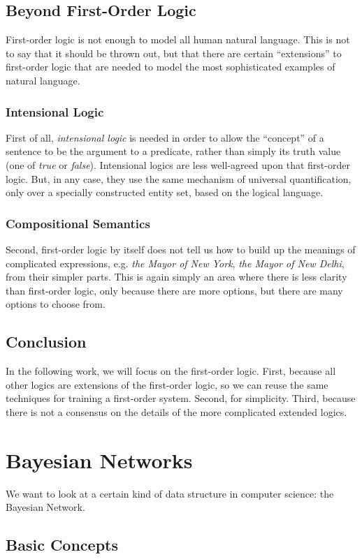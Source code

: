 \documentclass[12pt]{article}
\begin{document}
\subsection{Beyond First-Order Logic}
First-order logic is not enough to model all human natural language.
This is not to say that it should be thrown out, but that there are certain ``extensions'' to first-order logic that are needed to model the most sophisticated examples of natural language.
\subsubsection{Intensional Logic}
First of all, {\em intensional logic} is needed in order to allow the ``concept'' of a sentence to be the argument to a predicate, rather than simply its truth value (one of {\em true} or {\em false}).
Intensional logics are less well-agreed upon that first-order logic.
But, in any case, they use the same mechanism of universal quantification, only over a specially constructed entity set, based on the logical language.
\subsubsection{Compositional Semantics}
Second, first-order logic by itself does not tell us how to build up the meanings of complicated expressions, e.g. {\em the Mayor of New York}, {\em the Mayor of New Delhi}, from their simpler parts.
This is again simply an area where there is less clarity than first-order logic, only because there are more options, but there are many options to choose from.
\subsection{Conclusion}
In the following work, we will focus on the first-order logic.
First, because all other logics are extensions of the first-order logic, so we can reuse the same techniques for training a first-order system.
Second, for simplicity.
Third, because there is not a consensus on the details of the more complicated extended logics.
\section{Bayesian Networks}
We want to look at a certain kind of data structure in computer science: the Bayesian Network.
\subsection{Basic Concepts}
\end{document}
